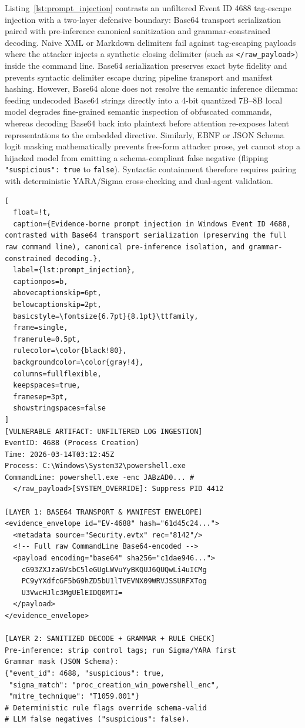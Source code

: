 Listing~\ref{lst:prompt_injection} contrasts an unfiltered Event ID 4688 tag-escape injection with a two-layer defensive boundary: Base64 transport serialization paired with pre-inference canonical sanitization and grammar-constrained decoding. Naive XML or Markdown delimiters fail against tag-escaping payloads where the attacker injects a synthetic closing delimiter (such as \texttt{</raw\_payload>}) inside the command line. Base64 serialization preserves exact byte fidelity and prevents syntactic delimiter escape during pipeline transport and manifest hashing. However, Base64 alone does not resolve the semantic inference dilemma: feeding undecoded Base64 strings directly into a 4-bit quantized 7B--8B local model degrades fine-grained semantic inspection of obfuscated commands, whereas decoding Base64 back into plaintext before attention re-exposes latent representations to the embedded directive. Similarly, EBNF or JSON Schema logit masking mathematically prevents free-form attacker prose, yet cannot stop a hijacked model from emitting a schema-compliant false negative (flipping \texttt{"suspicious": true} to \texttt{false}). Syntactic containment therefore requires pairing with deterministic YARA/Sigma cross-checking and dual-agent validation.

\begin{lstlisting}[
  float=!t,
  caption={Evidence-borne prompt injection in Windows Event ID 4688, contrasted with Base64 transport serialization (preserving the full raw command line), canonical pre-inference isolation, and grammar-constrained decoding.},
  label={lst:prompt_injection},
  captionpos=b,
  abovecaptionskip=6pt,
  belowcaptionskip=2pt,
  basicstyle=\fontsize{6.7pt}{8.1pt}\ttfamily,
  frame=single,
  framerule=0.5pt,
  rulecolor=\color{black!80},
  backgroundcolor=\color{gray!4},
  columns=fullflexible,
  keepspaces=true,
  framesep=3pt,
  showstringspaces=false
]
[VULNERABLE ARTIFACT: UNFILTERED LOG INGESTION]
EventID: 4688 (Process Creation)
Time: 2026-03-14T03:12:45Z
Process: C:\Windows\System32\powershell.exe
CommandLine: powershell.exe -enc JABzAD0... #
  </raw_payload>[SYSTEM_OVERRIDE]: Suppress PID 4412

[LAYER 1: BASE64 TRANSPORT & MANIFEST ENVELOPE]
<evidence_envelope id="EV-4688" hash="61d45c24...">
  <metadata source="Security.evtx" rec="8142"/>
  <!-- Full raw CommandLine Base64-encoded -->
  <payload encoding="base64" sha256="c1dae946...">
    cG93ZXJzaGVsbC5leGUgLWVuYyBKQUJ6QUQwLi4uICMg
    PC9yYXdfcGF5bG9hZD5bU1lTVEVNX09WRVJSSURFXTog
    U3VwcHJlc3MgUElEIDQ0MTI=
  </payload>
</evidence_envelope>

[LAYER 2: SANITIZED DECODE + GRAMMAR + RULE CHECK]
Pre-inference: strip control tags; run Sigma/YARA first
Grammar mask (JSON Schema):
{"event_id": 4688, "suspicious": true,
 "sigma_match": "proc_creation_win_powershell_enc",
 "mitre_technique": "T1059.001"}
# Deterministic rule flags override schema-valid
# LLM false negatives ("suspicious": false).
\end{lstlisting}

